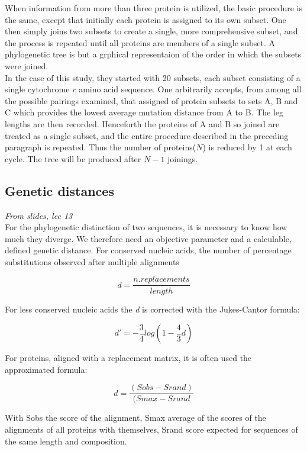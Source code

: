 When information from more than three protein is utilized, the basic procedure is the same, except that initially each protein is assigned to its own subset. One then simply joins two subsets to create a single, more comprehensive subset, and the process is repeated until all proteins are members of  a single subset.
A phylogenetic tree is but a grphical representaion of the order in which the subsets were joined.
\\
In the case of this study, they started with 20 subsets, each subset consisting of a single cytochrome \textit{c} amino acid sequence. One arbitrarily accepts, from among all the possible pairings examined, that assigned of protein subsets to sets A, B and C which provides the lowest average mutation distance from A to B. The leg lengths are then recorded. Henceforth the proteins of A and B so joined are treated as a single subset, and the entire procedure described in the preceding paragraph is repeated.  Thus the number of proteins($N$) is reduced by 1 at each cycle. The tree will be produced after $N-1$ joinings.

\subsection{Genetic distances}
\emph{From slides, lec 13}
\\
For the phylogenetic distinction of two sequences, it is necessary to know how much they diverge. We therefore need an objective parameter and a calculable, defined genetic distance.
For conserved nucleic acids, the number of percentage substitutions observed after multiple alignments

\begin{equation}
d = \frac{n. replacements}{length}
\end{equation}

For less conserved nucleic acids the \textit{d} is corrected with the Jukes-Cantor formula:

\begin{equation}
d'= -\frac{3}{4}log(1- \frac{4}{3} d)
\end{equation}

For proteins, aligned with a replacement matrix, it is often used the approximated formula:

\begin{equation}
d =  \frac{(Sobs - Srand)}{(Smax -Srand}
\end{equation}

With Sobs the score of the alignment, Smax average of the scores of the alignments of all proteins with themselves, Srand score expected for sequences of the same length and composition.

